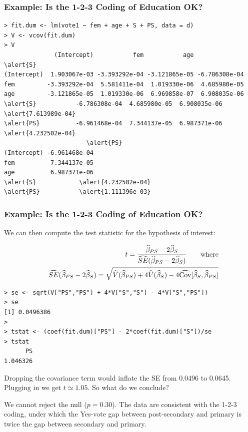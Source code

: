 \documentclass[xcolor=svgnames,9pt,english,aspectratio=169,t]{beamer}
\begin{document}
\begin{frame}[fragile]
\frametitle{Example: Is the 1-2-3 Coding of Education OK?}
\footnotesize

\begin{Verbatim}[fontsize=\footnotesize, frame=single, label=R Code, commandchars=\\\{\}]
> fit.dum <- lm(vote1 ~ fem + age + S + PS, data = d)
> V <- vcov(fit.dum)
> V
              (Intercept)           fem           age             \alert{S}
(Intercept)  1.903067e-03 -3.393292e-04 -3.121865e-05 -6.786308e-04
fem         -3.393292e-04  5.581411e-04  1.019330e-06  4.685980e-05
age         -3.121865e-05  1.019330e-06  6.969858e-07  6.908035e-06
\alert{S}           -6.786308e-04  4.685980e-05  6.908035e-06  \alert{7.613989e-04}
\alert{PS}          -6.961468e-04  7.344137e-05  6.987371e-06  \alert{4.232502e-04}
                       \alert{PS}
(Intercept) -6.961468e-04
fem          7.344137e-05
age          6.987371e-06
\alert{S}            \alert{4.232502e-04}
\alert{PS}           \alert{1.111396e-03}
\end{Verbatim}
\end{frame}

\begin{frame}[fragile]
\frametitle{Example: Is the 1-2-3 Coding of Education OK?}
\footnotesize
 We can then compute the test statistic for the hypothesis of interest:


\vspace{-.25\baselineskip}
\begin{eqnarray*}
& & t = \frac{\widehat{\beta}_{PS}-2\widehat{\beta}_{S}}{\widehat{SE}(\widehat{\beta}_{PS}-2\widehat{\beta}_{S})} \quad \quad \text{where} \\\bigskip
& & \widehat{SE}(\widehat{\beta}_{PS}-2\widehat{\beta}_{S})=\sqrt{\widehat{V}(\widehat{\beta}_{PS}) + 4\widehat{V}(\widehat{\beta}_{S}) - 4\widehat{\cov}[\widehat{\beta}_{S},\widehat{\beta}_{PS}]}
\end{eqnarray*}
\vspace{-.5\baselineskip}


\begin{Verbatim}[fontsize=\footnotesize, frame=single, label=R Code, commandchars=\\\{\}]
> se <- sqrt(V["PS","PS"] + 4*V["S","S"] - 4*V["S","PS"])
> se
[1] 0.0496386
>
> tstat <- (coef(fit.dum)["PS"] - 2*coef(fit.dum)["S"])/se
> tstat
      PS
1.046326
\end{Verbatim}

Dropping the covariance term would inflate the SE from 0.0496 to 0.0645.
Plugging in we get $t \simeq 1.05$. So what do we conclude?

\pause
\medskip

We cannot reject the null ($p = 0.30$). The data are consistent with the 1-2-3 coding, under which the Yes-vote gap between post-secondary and primary is twice the gap between secondary and primary.

\end{frame}
\end{document}
